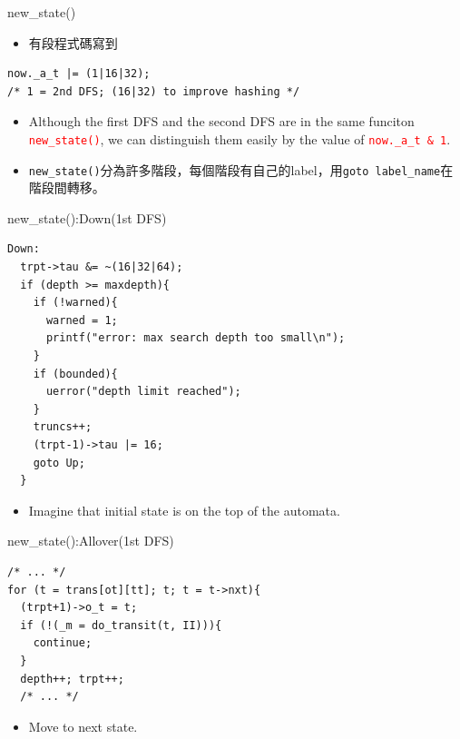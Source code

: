 \documentclass[12pt]{beamer}
\newcommand{\code}[1]{\texttt{#1}}
\begin{document}
\begin{frame}[fragile]{new\_state()}
\begin{itemize}
	\item 有段程式碼寫到
\end{itemize}
\begin{lstlisting}[basicstyle=\normalsize\ttfamily]
now._a_t |= (1|16|32);
/* 1 = 2nd DFS; (16|32) to improve hashing */
\end{lstlisting}
\begin{itemize}
	\item Although the first DFS and the second DFS are in the same funciton \textcolor{red}{\code{new\_state()}}, we can distinguish them easily by the value of \textcolor{red}{\code{now.\_a\_t \& 1}}.
	\item \code{new\_state()}分為許多階段，每個階段有自己的label，用\code{goto label\_name}在階段間轉移。
\end{itemize}
\end{frame}

\begin{frame}[fragile]{new\_state():Down(1st DFS)}
\begin{lstlisting}[basicstyle=\footnotesize\ttfamily]
Down:
  trpt->tau &= ~(16|32|64);
  if (depth >= maxdepth){
    if (!warned){ 
      warned = 1;
      printf("error: max search depth too small\n");
    }
    if (bounded){ 
      uerror("depth limit reached");
    }
    truncs++;
    (trpt-1)->tau |= 16;
    goto Up;
  }
\end{lstlisting}
\begin{itemize}
	\item Imagine that initial state is on the top of the automata.
\end{itemize}
\end{frame}

\begin{frame}[fragile]{new\_state():Allover(1st DFS)}
\begin{lstlisting}[basicstyle=\normalsize\ttfamily]
  /* ... */
for (t = trans[ot][tt]; t; t = t->nxt){
  (trpt+1)->o_t = t;
  if (!(_m = do_transit(t, II))){
    continue;
  }
  depth++; trpt++;
  /* ... */
\end{lstlisting}
\begin{itemize}
	\item Move to next state.
\end{itemize}
\end{frame}
\end{document}
